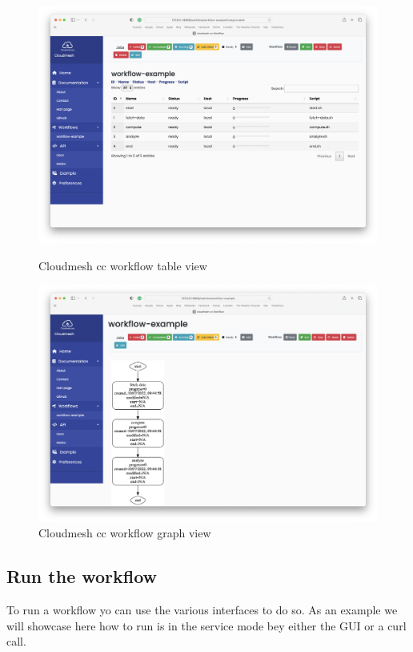 \begin{figure}[htb]
{\centering
\includegraphics[width=1.05\columnwidth]{images/service-table.png}}
\caption{Cloudmesh cc workflow table view}\label{fig:table}

{\includegraphics[width=1.05\columnwidth]{images/service-graph.png}
  \caption{Cloudmesh cc workflow graph view}}
\label{fig:graph}
\end{figure}



\subsection{Run the workflow}\label{run-the-workflow}

To run a workflow yo can use the various interfaces to do so. As an
example we will showcase here how to run is in the service mode bey
either the GUI or a curl call.

